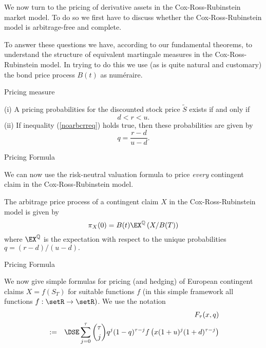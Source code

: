 



	We now turn to the pricing of derivative assets in the
Cox-Ross-Rubinstein market model. To do so we first have to
discuss whether the Cox-Ross-Rubinstein model is arbitrage-free
and complete.


	To answer these questions we have, according to our fundamental
theorems, to
understand the structure of equivalent martingale measures in the
Cox-Ross-Rubinstein model. In trying to do this we use (as is
quite natural and customary) the bond price process $B(t)$ as
num\'{e}raire.





{Pricing measure}

(i) A pricing probabilities for the discounted stock price
$\tilde{S}$ exists if and only if
\begin{equation}\label{noarbcrreq}
d < r < u.
\end{equation}
(ii) If inequality (\ref{noarbcrreq}) holds true, then these probabilities are given by
\begin{equation}\label{crrprob}
q=\frac{r-d}{u-d}.
\end{equation}

{Pricing Formula}







	We can now use the risk-neutral valuation formula to price {\it
every} contingent claim in the Cox-Ross-Rubinstein model.


	The arbitrage price process of a contingent claim $X$ in the
Cox-Ross-Rubinstein model is given by
$$
\pi_X(0) = B(t) \EX^\mathbb{Q}\left( X/B(T)\right)
$$
where $\EX^\mathbb{Q}$ is the expectation with respect to the
unique probabilities
$q= (r-d)/(u-d).$





{Pricing Formula}







	We now give simple formulas for pricing (and hedging) of European
contingent claims $X=f(S_T)$ for suitable functions $f$ (in this
simple framework all functions $f:\setR \rightarrow \setR)$. We
use the notation
\begin{eqnarray}\label{BinomialF}
&& F_\tau(x,q)\\\nonumber
&:=&\DSE \sum_{j=0}^\tau {\tau \choose j} q^j (1-q)^{\tau-j}
f\left(x(1+u)^j(1+d)^{\tau-j}\right)
\end{eqnarray}


